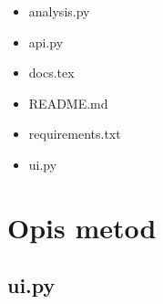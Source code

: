 \documentclass[12pt]{article}
\begin{document}
    \begin{itemize}
        \item analysis.py
        \item api.py
        \item docs.tex
        \item README.md
        \item requirements.txt
        \item ui.py
    \end{itemize}


    \section{Opis metod}\label{sec:uzyte-metody}

    \subsection{ui.py}\label{subsec:ui.py}
\end{document}
